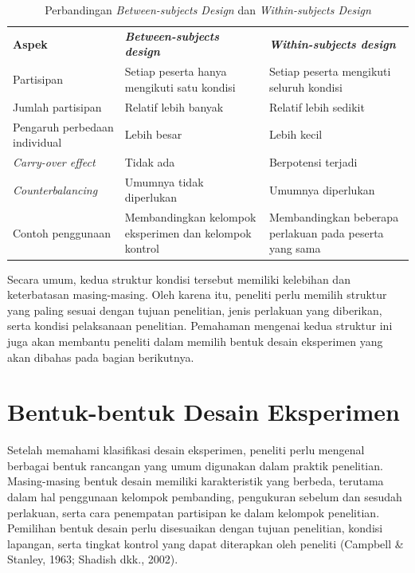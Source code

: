 \documentclass[
  indonesian,
  letterpaper,
  DIV=11,
  numbers=noendperiod]{scrreprt}
\begin{document}
\begin{longtable}[]{@{}
  >{\raggedright\arraybackslash}p{}
  >{\raggedright\arraybackslash}p{}
  >{\raggedright\arraybackslash}p{}@{}}
\caption{Perbandingan \emph{Between-subjects Design} dan
\emph{Within-subjects Design}}\label{tbl-struktur}\tabularnewline
\toprule\noalign{}
\endfirsthead
\endhead
\bottomrule\noalign{}
\endlastfoot
\textbf{Aspek} & \textbf{\emph{Between-subjects design}} &
\textbf{\emph{Within-subjects design}} \\
Partisipan & Setiap peserta hanya mengikuti satu kondisi & Setiap
peserta mengikuti seluruh kondisi \\
Jumlah partisipan & Relatif lebih banyak & Relatif lebih sedikit \\
Pengaruh perbedaan individual & Lebih besar & Lebih kecil \\
\emph{Carry-over effect} & Tidak ada & Berpotensi terjadi \\
\emph{Counterbalancing} & Umumnya tidak diperlukan & Umumnya
diperlukan \\
Contoh penggunaan & Membandingkan kelompok eksperimen dan kelompok
kontrol & Membandingkan beberapa perlakuan pada peserta yang sama \\
\end{longtable}

Secara umum, kedua struktur kondisi tersebut memiliki kelebihan dan
keterbatasan masing-masing. Oleh karena itu, peneliti perlu memilih
struktur yang paling sesuai dengan tujuan penelitian, jenis perlakuan
yang diberikan, serta kondisi pelaksanaan penelitian. Pemahaman mengenai
kedua struktur ini juga akan membantu peneliti dalam memilih bentuk
desain eksperimen yang akan dibahas pada bagian berikutnya.

\section{Bentuk-bentuk Desain
Eksperimen}\label{bentuk-bentuk-desain-eksperimen}

Setelah memahami klasifikasi desain eksperimen, peneliti perlu mengenal
berbagai bentuk rancangan yang umum digunakan dalam praktik penelitian.
Masing-masing bentuk desain memiliki karakteristik yang berbeda,
terutama dalam hal penggunaan kelompok pembanding, pengukuran sebelum
dan sesudah perlakuan, serta cara penempatan partisipan ke dalam
kelompok penelitian. Pemilihan bentuk desain perlu disesuaikan dengan
tujuan penelitian, kondisi lapangan, serta tingkat kontrol yang dapat
diterapkan oleh peneliti (Campbell \& Stanley, 1963; Shadish dkk.,
2002).
\end{document}
